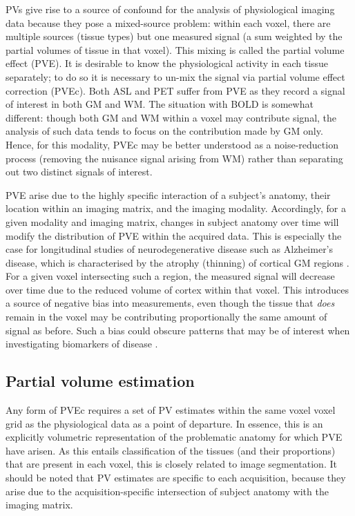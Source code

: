 PVs give rise to a source of confound for the analysis of physiological imaging data because they pose a mixed-source problem: within each voxel, there are multiple sources (tissue types) but one measured signal (a sum weighted by the partial volumes of tissue in that voxel). This mixing is called the partial volume effect (PVE). It is desirable to know the physiological activity in each tissue separately; to do so it is necessary to un-mix the signal via partial volume effect correction (PVEc). Both ASL and PET suffer from PVE as they record a signal of interest in both GM and WM. The situation with BOLD is somewhat different: though both GM and WM within a voxel may contribute signal, the analysis of such data tends to focus on the contribution made by GM only. Hence, for this modality, PVEc may be better understood as a noise-reduction process (removing the nuisance signal arising from WM) rather than separating out two distinct signals of interest. 

PVE arise due to the highly specific interaction of a subject's anatomy, their location within an imaging matrix, and the imaging modality. Accordingly, for a given modality and imaging matrix, changes in subject anatomy over time will modify the distribution of PVE within the acquired data. This is especially the case for longitudinal studies of neurodegenerative disease such as Alzheimer's disease, which is characterised by the atrophy (thinning) of cortical GM regions \cite{Thompson2003}. For a given voxel intersecting such a region, the measured signal will decrease over time due to the reduced volume of cortex within that voxel. This introduces a source of negative bias into measurements, even though the tissue that \textit{does} remain in the voxel may be contributing proportionally the same amount of signal as before. Such a bias could obscure patterns that may be of interest when investigating biomarkers of disease \cite{Thomas2011}. 

\subsection{Partial volume estimation}

Any form of PVEc requires a set of PV estimates within the same voxel voxel grid as the physiological data as a point of departure. In essence, this is an explicitly volumetric representation of the problematic anatomy for which PVE have arisen. As this entails classification of the tissues (and their proportions) that are present in each voxel, this is closely related to image segmentation. It should be noted that PV estimates are specific to each acquisition, because they arise due to the acquisition-specific intersection of subject anatomy with the imaging matrix. 

